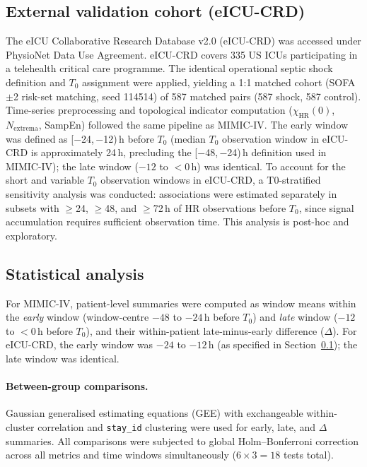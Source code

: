 \documentclass[12pt,a4paper]{article}
\begin{document}
\subsection{External validation cohort (eICU-CRD)}
\label{sec:eicu-method}

The eICU Collaborative Research Database v2.0 (eICU-CRD)
\cite{pollard2018} was accessed under PhysioNet Data Use Agreement.
eICU-CRD covers 335 US ICUs participating in a telehealth critical care
programme.
The identical operational septic shock definition and $T_0$ assignment
were applied, yielding a 1:1 matched cohort (SOFA\,$\pm$2 risk-set
matching, seed 114514) of 587 matched pairs (587 shock, 587 control).
Time-series preprocessing and topological indicator computation
($\chi_{\text{HR}}(0)$, $N_{\text{extrema}}$, SampEn) followed the
same pipeline as MIMIC-IV.
The early window was defined as [$-$24,\,$-$12)\,h before $T_0$
(median $T_0$ observation window in eICU-CRD is approximately 24\,h,
precluding the [$-$48,\,$-$24)\,h definition used in MIMIC-IV);
the late window ($-12$ to $<$0\,h) was identical.
To account for the short and variable $T_0$ observation windows in
eICU-CRD, a T0-stratified sensitivity analysis was conducted:
associations were estimated separately in subsets with $\geq$24,
$\geq$48, and $\geq$72\,h of HR observations before $T_0$, since
signal accumulation requires sufficient observation time.
This analysis is post-hoc and exploratory.

\subsection{Statistical analysis}
\label{sec:stats}

For MIMIC-IV, patient-level summaries were computed as window means
within the \emph{early} window (window-centre $-48$ to $-24$\,h before
$T_0$) and \emph{late} window ($-12$ to $<0$\,h before $T_0$), and their
within-patient late-minus-early difference ($\Delta$).
For eICU-CRD, the early window was $-24$ to $-12$\,h (as specified
in Section~\ref{sec:eicu-method}); the late window was identical.

\paragraph{Between-group comparisons.}
Gaussian generalised estimating equations (GEE) \cite{liang1986} with
exchangeable within-cluster correlation and \texttt{stay\_id} clustering
were used for early, late, and $\Delta$ summaries.
All comparisons were subjected to global Holm--Bonferroni correction across
all metrics and time windows simultaneously ($6 \times 3 = 18$ tests total).
\end{document}
